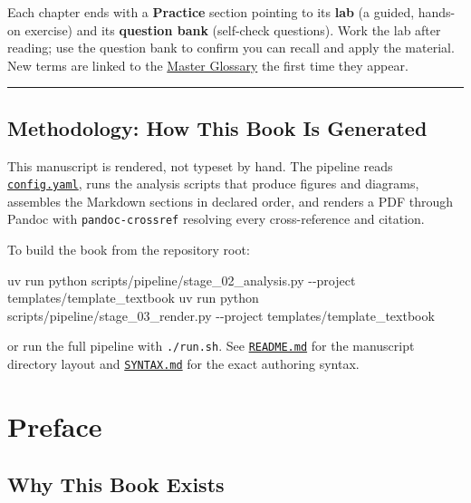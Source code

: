 \documentclass[
]{article}
\newenvironment{Shaded}{}{}
\newcommand{\AttributeTok}[1]{\textcolor[rgb]{0.49,0.56,0.16}{#1}}
\newcommand{\ExtensionTok}[1]{#1}
\newcommand{\NormalTok}[1]{#1}
\theoremstyle{plain}
\theoremstyle{definition}
\begin{document}
Each chapter ends with a \textbf{Practice} section pointing to its
\textbf{lab} (a guided, hands-on exercise) and its \textbf{question
bank} (self-check questions). Work the lab after reading; use the
question bank to confirm you can recall and apply the material. New
terms are linked to the \href{glossary.md}{Master Glossary} the first
time they appear.

\begin{center}\rule{0.5\linewidth}{0.5pt}\end{center}

\subsection{Methodology: How This Book Is
Generated}\label{methodology-how-this-book-is-generated}

This manuscript is rendered, not typeset by hand. The pipeline reads
\href{config.yaml}{\texttt{config.yaml}}, runs the analysis scripts that
produce figures and diagrams, assembles the Markdown sections in
declared order, and renders a PDF through Pandoc with
\texttt{pandoc-crossref} resolving every cross-reference and citation.

To build the book from the repository root:

\begin{Shaded}
\begin{Highlighting}[]
\ExtensionTok{uv}\NormalTok{ run python scripts/pipeline/stage\_02\_analysis.py }\AttributeTok{{-}{-}project}\NormalTok{ templates/template\_textbook}
\ExtensionTok{uv}\NormalTok{ run python scripts/pipeline/stage\_03\_render.py    }\AttributeTok{{-}{-}project}\NormalTok{ templates/template\_textbook}
\end{Highlighting}
\end{Shaded}

or run the full pipeline with \texttt{./run.sh}. See
\href{README.md}{\texttt{README.md}} for the manuscript directory layout
and \href{SYNTAX.md}{\texttt{SYNTAX.md}} for the exact authoring syntax.

\newpage

\section{Preface}\label{preface}

\subsection{Why This Book Exists}\label{why-this-book-exists}
\end{document}
